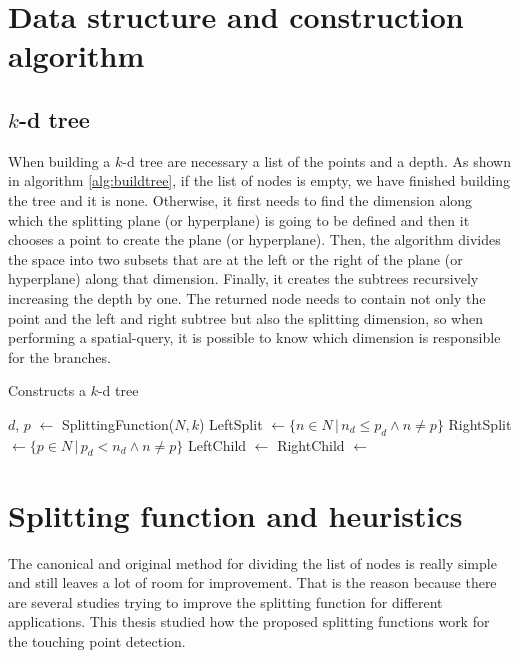 \section{Data structure and construction algorithm}
\subsection{$k$-d tree}
When building a $k$-d tree are necessary a list of the points and a depth. As shown in algorithm \ref{alg:buildtree}, if the list of nodes is empty, we have finished building the tree and it is none. Otherwise, it first needs to find the dimension along which the splitting plane (or hyperplane) is going to be defined and then it chooses a point to create the plane (or hyperplane). Then, the algorithm divides the space into two subsets that are at the left or the right of the plane (or hyperplane) along that dimension. Finally, it creates the subtrees recursively increasing the depth by one. The returned node needs to contain not only the point and the left and right subtree but also the splitting dimension, so when performing a spatial-query, it is possible to know which dimension is responsible for the branches. 
\begin{algorithm}[h!]
    \caption{Constructs a $k$-d tree
        \label{alg:buildtree}}
    \begin{algorithmic}[1]
    \Statex
            \State {}
        \EndIf
        \State $d$, $p$ $\gets$ SplittingFunction($N, k$) 
        \State LeftSplit  $\gets \{ n \in N\, |\, n_d \leq p_d \land n \neq p \} $ 
        \State RightSplit $\gets \{ p \in N\, |\, p_d   <  n_d \land n \neq p \} $ 
        \State LeftChild  $\gets$ 
        \State RightChild $\gets$ 
        \State {}
    \EndFunction
    \end{algorithmic}
\end{algorithm}

\pagebreak

\section{Splitting function and heuristics}
The canonical and original method for dividing the list of nodes is really simple and still leaves a lot of room for improvement. That is the reason because there are several studies trying to improve the splitting function for different applications. This thesis studied how the proposed splitting functions work for the touching point detection.

